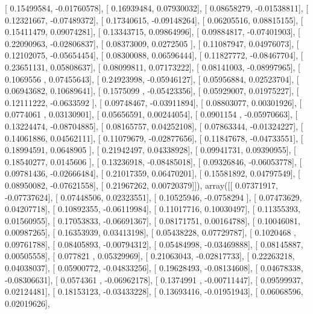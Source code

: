\documentclass{article}
\begin{document}
       [ 0.15499584, -0.01760578],
       [ 0.16939484,  0.07930032],
       [ 0.08658279, -0.01538811],
       [ 0.12321667, -0.07489372],
       [ 0.17340615, -0.09148264],
       [ 0.06205516,  0.08815155],
       [ 0.15411479,  0.09074281],
       [ 0.13343715,  0.09864996],
       [ 0.09884817, -0.07401903],
       [ 0.22090963, -0.02806837],
       [ 0.08373009,  0.0272505 ],
       [ 0.11087947,  0.04976073],
       [ 0.12102075, -0.05654454],
       [ 0.08300088,  0.06596444],
       [ 0.11827772, -0.08467704],
       [ 0.23651131,  0.05808637],
       [ 0.08099811,  0.07173222],
       [ 0.08141003, -0.08997965],
       [ 0.1069556 ,  0.07455643],
       [ 0.24923998, -0.05946127],
       [ 0.05956884,  0.02523704],
       [ 0.06943682,  0.10689641],
       [ 0.1575099 , -0.05423356],
       [ 0.05929007,  0.01975227],
       [ 0.12111222, -0.0633592 ],
       [ 0.09748467, -0.03911894],
       [ 0.08803077,  0.00301926],
       [ 0.0774061 ,  0.03130901],
       [ 0.05656591,  0.00244054],
       [ 0.0901154 , -0.05970663],
       [ 0.13224474, -0.08704885],
       [ 0.08165757,  0.04252108],
       [ 0.07863344, -0.01324227],
       [ 0.14061886,  0.04562111],
       [ 0.11079679, -0.02877656],
       [ 0.11847678, -0.04733551],
       [ 0.18994591,  0.0648905 ],
       [ 0.21942497,  0.04338928],
       [ 0.09941731,  0.09390955],
       [ 0.18540277,  0.0145606 ],
       [ 0.13236918, -0.08485018],
       [ 0.09326846, -0.06053778],
       [ 0.09781436, -0.02666484],
       [ 0.21017359,  0.06470201],
       [ 0.15581892,  0.04797549],
       [ 0.08950082, -0.07621558],
       [ 0.21967262,  0.00720379]]), array([[ 0.07371917, -0.07737624],
       [ 0.07448506,  0.02323551],
       [ 0.10525946, -0.0758294 ],
       [ 0.07473629,  0.04207718],
       [ 0.10892355, -0.06119984],
       [ 0.11017716,  0.10030497],
       [ 0.11355393,  0.01560955],
       [ 0.17053833, -0.06691367],
       [ 0.08171751,  0.00164788],
       [ 0.10046081,  0.00987265],
       [ 0.16353939,  0.03413198],
       [ 0.05438228,  0.07729787],
       [ 0.1020468 ,  0.09761788],
       [ 0.08405893, -0.00794312],
       [ 0.05484998, -0.03469888],
       [ 0.08145887,  0.00505558],
       [ 0.077821  ,  0.05329969],
       [ 0.21063043, -0.02817733],
       [ 0.22263218,  0.04038037],
       [ 0.05900772, -0.04833256],
       [ 0.19628493, -0.08134608],
       [ 0.04678338, -0.08306631],
       [ 0.0574361 , -0.06962178],
       [ 0.1374991 , -0.00711447],
       [ 0.09599937,  0.02124481],
       [ 0.18153123, -0.03433228],
       [ 0.13693416, -0.01951943],
       [ 0.06068596,  0.02019626],
\end{document}
